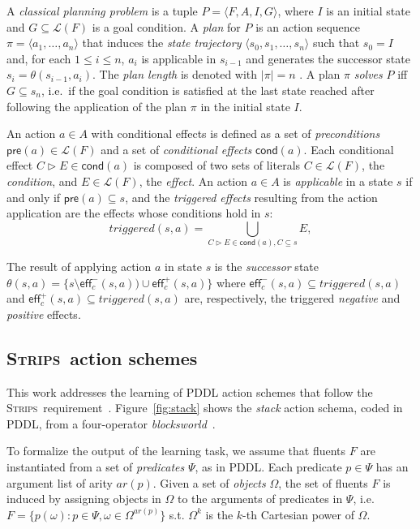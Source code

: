 \documentclass{article}
\newcommand{\tup}[1]{{\langle #1 \rangle}}
\newcommand{\pre}{\mathsf{pre}}     %
\newcommand{\eff}{\mathsf{eff}}     %
\newcommand{\cond}{\mathsf{cond}}   %
\newcommand{\strips}{\textsc{Strips}}     %
\begin{document}
A {\em classical planning problem} is a tuple $P=\tup{F,A,I,G}$, where $I$ is an initial state and $G\subseteq\mathcal{L}(F)$ is a goal condition. A {\em plan} for $P$ is an action sequence $\pi=\tup{a_1, \ldots, a_n}$ that induces the {\em state trajectory} $\tup{s_0, s_1, \ldots, s_n}$ such that $s_0=I$ and, for each {\small $1\leq i\leq n$}, $a_i$ is applicable in $s_{i-1}$ and generates the successor state $s_i=\theta(s_{i-1},a_i)$. The {\em plan length} is denoted with $|\pi|=n$ . A plan $\pi$ {\em solves} $P$ iff $G\subseteq s_n$, i.e.~if the goal condition is satisfied at the last state reached after following the application of the plan $\pi$ in the initial state $I$.

An action $a\in A$ with conditional effects is defined as a set of {\em preconditions} $\pre(a)\in\mathcal{L}(F)$ and a set of {\em conditional effects} $\cond(a)$. Each conditional effect $C\rhd E\in\cond(a)$ is composed of two sets of literals $C\in\mathcal{L}(F)$, the {\em condition}, and $E\in\mathcal{L}(F)$, the {\em effect}. An action $a\in A$ is {\em applicable} in a state $s$ if and only if $\pre(a)\subseteq s$, and the {\em triggered effects} resulting from the action application are the effects whose conditions hold in $s$:
\[
triggered(s,a)=\bigcup_{C\rhd E\in\cond(a),C\subseteq s} E,
\]

The result of applying action $a$ in state $s$ is the {\em successor} state $\theta(s,a)=\{s\setminus\eff_c^-(s,a))\cup\eff_c^+(s,a)\}$ where $\eff_c^-(s,a)\subseteq triggered(s,a)$ and $\eff_c^+(s,a)\subseteq triggered(s,a)$ are, respectively, the triggered {\em negative} and {\em positive} effects.


\subsection{\strips\ action schemes}
This work addresses the learning of PDDL action schemes that follow the \strips\ requirement~\cite{mcdermott1998pddl,fox2003pddl2}. Figure~\ref{fig:stack} shows the {\em stack} action schema, coded in PDDL, from a four-operator {\em blocksworld}~\cite{slaney2001blocks}.

To formalize the output of the learning task, we assume that fluents $F$ are instantiated from a set of {\em predicates} $\Psi$, as in PDDL. Each predicate $p\in\Psi$ has an argument list of arity $ar(p)$. Given a set of {\em objects} $\Omega$, the set of fluents $F$ is induced by assigning objects in $\Omega$ to the arguments of predicates in $\Psi$, i.e.~$F=\{p(\omega):p\in\Psi,\omega\in\Omega^{ar(p)}\}$ s.t. $\Omega^k$ is the $k$-th Cartesian power of $\Omega$.
\end{document}
